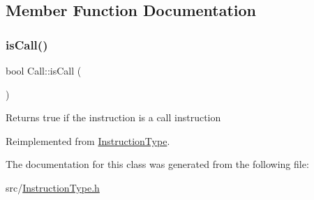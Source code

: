 \subsection{Member Function Documentation}
\mbox{\label{classCall_a2f33492c84abcac87ff5e388535f6cfb}} 
\subsubsection{\texorpdfstring{is\+Call()}{isCall()}}
{\footnotesize\ttfamily bool Call\+::is\+Call (\begin{DoxyParamCaption}{ }\end{DoxyParamCaption})\hspace{0.3cm}{\ttfamily [virtual]}}

Returns true if the instruction is a call instruction 

Reimplemented from \hyperlink{classInstructionType_ad49a039e3b57e3b7b369a7c0c6c0932b}{Instruction\+Type}.



The documentation for this class was generated from the following file\+:\begin{DoxyCompactItemize}
\item 
src/\hyperlink{InstructionType_8h}{Instruction\+Type.\+h}\end{DoxyCompactItemize}

